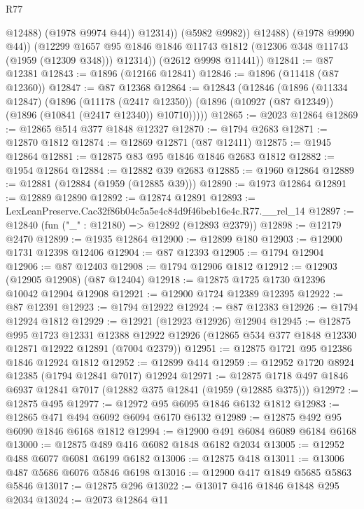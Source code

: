 \begin{lexlean}{R77}
\begin{coremodule}
                      @12488)
                    (@1978 @9974 @44))
                  @12314))
              (@5982 @9982))
            @12488)
          (@1978 @9990 @44))
        (@12299
          @1657
          @95
          @1846
          @1846
          @11743
          @1812
          (@12306 @348 @11743 (@1959 (@12309 @348)))
          @12314))
      (@2612 @9998 @11441))
@12841 := @87 @12381
@12843 := @1896 (@12166 @12841)
@12846 := @1896 (@11418 (@87 @12360))
@12847 := @87 @12368
@12864 := @12843
    (@12846
      (@1896
        (@11334 @12847)
        (@1896
          (@11178 (@2417 @12350))
          (@1896 (@10927 (@87 @12349)) (@1896 (@10841 (@2417 @12340)) @10710)))))
@12865 := @2023 @12864
@12869 := @12865 @514 @377 @1848 @12327
@12870 := @1794 @2683
@12871 := @12870 @1812
@12874 := @12869 @12871 (@87 @12411)
@12875 := @1945 @12864
@12881 := @12875 @83 @95 @1846 @1846 @2683 @1812
@12882 := @1954 @12864
@12884 := @12882 @39 @2683
@12885 := @1960 @12864
@12889 := @12881 (@12884 (@1959 (@12885 @39)))
@12890 := @1973 @12864
@12891 := @12889 @12890
@12892 := @12874 @12891
@12893 := LexLeanPreserve.Cac32f86b04c5a5e4c84d9f46beb16e4c.R77.__rel_14
@12897 := @12840 (fun ("_" : @12180) => @12892 (@12893 @2379))
@12898 := @12179 @2470
@12899 := @1935 @12864
@12900 := @12899 @180
@12903 := @12900 @1731 @12398 @12406
@12904 := @87 @12393
@12905 := @1794 @12904
@12906 := @87 @12403
@12908 := @1794 @12906 @1812
@12912 := @12903 (@12905 @12908) (@87 @12404)
@12918 := @12875 @1725 @1730 @12396 @10042 @12904 @12908
@12921 := @12900 @1724 @12389 @12395
@12922 := @87 @12391
@12923 := @1794 @12922
@12924 := @87 @12383
@12926 := @1794 @12924 @1812
@12929 := @12921 (@12923 @12926) @12904
@12945 := @12875
    @995
    @1723
    @12331
    @12388
    @12922
    @12926
    (@12865 @534 @377 @1848 @12330 @12871 @12922 @12891 (@7004 @2379))
@12951 := @12875 @1721 @95 @12386 @1846 @12924 @1812
@12952 := @12899 @414
@12959 := @12952 @1720 @8924 @12385 (@1794 @12841 @7017) @12924
@12971 := @12875 @1718 @497 @1846 @6937 @12841 @7017 (@12882 @375 @12841 (@1959 (@12885 @375)))
@12972 := @12875 @495
@12977 := @12972 @95 @6095 @1846 @6132 @1812
@12983 := @12865 @471 @494 @6092 @6094 @6170 @6132
@12989 := @12875 @492 @95 @6090 @1846 @6168 @1812
@12994 := @12900 @491 @6084 @6089 @6184 @6168
@13000 := @12875 @489 @416 @6082 @1848 @6182 @2034
@13005 := @12952 @488 @6077 @6081 @6199 @6182
@13006 := @12875 @418
@13011 := @13006 @487 @5686 @6076 @5846 @6198
@13016 := @12900 @417 @1849 @5685 @5863 @5846
@13017 := @12875 @296
@13022 := @13017 @416 @1846 @1848 @295 @2034
@13024 := @2073 @12864 @11

\end{coremodule}
\end{lexlean}
